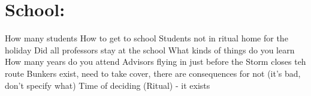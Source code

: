 \documentclass[blue]{GL2020}
\begin{document}
\name{\bSchool{}}

\section*{School:}

How many students
How to get to school
Students not in ritual home for the holiday
Did all professors stay at the school
What kinds of things do you learn
How many years do you attend
Advisors flying in just before the Storm closes teh route
Bunkers exist, need to take cover, there are consequences for not (it's bad, don't specify what)
Time of deciding (Ritual) - it exists
\end{document}
